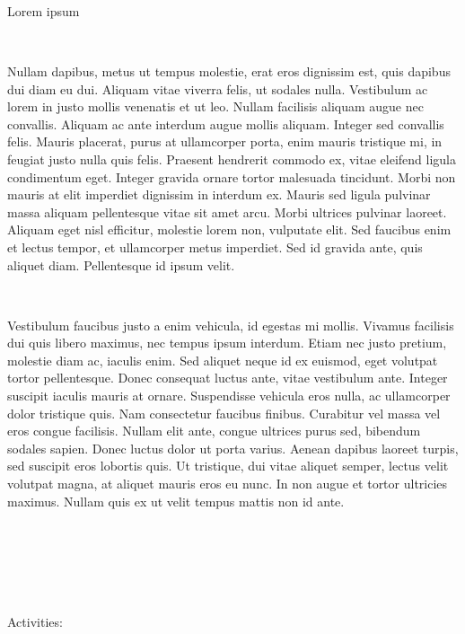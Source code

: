 \documentclass[
]{book}
\begin{document}
{~}

{~}

{~}

{Lorem ipsum}

{~}

Nullam dapibus, metus ut tempus molestie, erat eros dignissim est, quis dapibus dui diam eu dui. Aliquam vitae viverra felis, ut sodales nulla. Vestibulum ac lorem in justo mollis venenatis et ut leo. Nullam facilisis aliquam augue nec convallis. Aliquam ac ante interdum augue mollis aliquam. Integer sed convallis felis. Mauris placerat, purus at ullamcorper porta, enim mauris tristique mi, in feugiat justo nulla quis felis. Praesent hendrerit commodo ex, vitae eleifend ligula condimentum eget. Integer gravida ornare tortor malesuada tincidunt. Morbi non mauris at elit imperdiet dignissim in interdum ex. Mauris sed ligula pulvinar massa aliquam pellentesque vitae sit amet arcu. Morbi ultrices pulvinar laoreet. Aliquam eget nisl efficitur, molestie lorem non, vulputate elit. Sed faucibus enim et lectus tempor, et ullamcorper metus imperdiet. Sed id gravida ante, quis aliquet diam. Pellentesque id ipsum velit.

~

Vestibulum faucibus justo a enim vehicula, id egestas mi mollis. Vivamus facilisis dui quis libero maximus, nec tempus ipsum interdum. Etiam nec justo pretium, molestie diam ac, iaculis enim. Sed aliquet neque id ex euismod, eget volutpat tortor pellentesque. Donec consequat luctus ante, vitae vestibulum ante. Integer suscipit iaculis mauris at ornare. Suspendisse vehicula eros nulla, ac ullamcorper dolor tristique quis. Nam consectetur faucibus finibus. Curabitur vel massa vel eros congue facilisis. Nullam elit ante, congue ultrices purus sed, bibendum sodales sapien. Donec luctus dolor ut porta varius. Aenean dapibus laoreet turpis, sed suscipit eros lobortis quis. Ut tristique, dui vitae aliquet semper, lectus velit volutpat magna, at aliquet mauris eros eu nunc. In non augue et tortor ultricies maximus. Nullam quis ex ut velit tempus mattis non id ante.

~

~

~

Activities:

~
\end{document}
